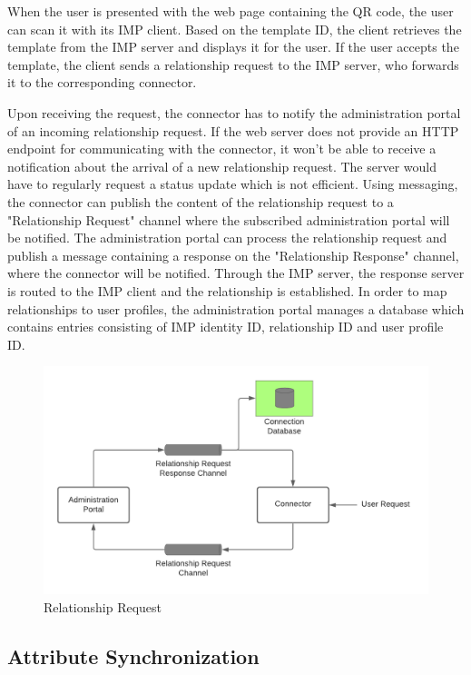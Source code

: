 When the user is presented with the web page containing the QR code, the user can scan it with its IMP client. Based on the template ID, the client retrieves the template from the IMP server and displays it for the user. If the user accepts the template, the client sends a relationship request to the IMP server, who forwards it to the corresponding connector.

Upon receiving the request, the connector has to notify the administration portal of an incoming relationship request. If the web server does not provide an HTTP endpoint for communicating with the connector, it won't be able to receive a notification about the arrival of a new relationship request. The server would have to regularly request a status update which is not efficient. Using messaging, the connector can publish the content of the relationship request to a "Relationship Request" channel where the subscribed administration portal will be notified. The administration portal can process the relationship request and publish a message containing a response on the "Relationship Response" channel, where the connector will be notified. Through the IMP server, the response server is routed to the IMP client and the relationship is established.
In order to map relationships to user profiles, the administration portal manages a database which contains entries consisting of IMP identity ID, relationship ID and user profile ID.

\begin{figure}[h]
    \centering
    \caption{Relationship Request}
    \includegraphics[scale=0.3]{Diagrams/Integration Architecture 1/Overview/Relationship Request.png}
\end{figure}

\subsection{Attribute Synchronization}

